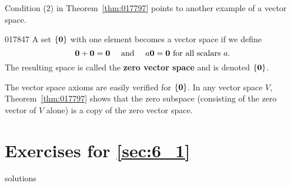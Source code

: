 Condition (2) in Theorem~\ref{thm:017797} points to another example of a vector space.

\begin{example}{}{017847}
A set $\{\textbf{0}\}$ with one element becomes a vector space if we define
\begin{equation*}
\textbf{0} + \textbf{0} = \textbf{0}  \quad \mbox{ and } \quad a\textbf{0} = \textbf{0} \mbox{ for all scalars } a.
\end{equation*}
The resulting space is called the \textbf{zero vector space} and is denoted $\{\textbf{0}\}$.
\end{example}

\noindent The vector space axioms are easily verified for $\{\textbf{0}\}$. In any vector space $V$, Theorem~\ref{thm:017797} shows that the zero subspace (consisting of the zero vector of $V$ alone) is a copy of the zero vector space.

\section*{Exercises for \ref{sec:6_1}}

\begin{Filesave}{solutions}
\end{Filesave}

